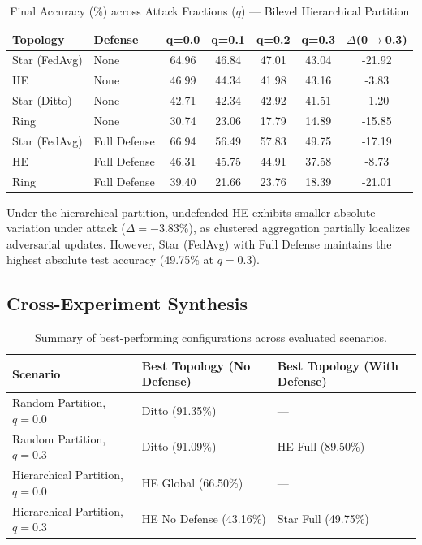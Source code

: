 \documentclass[11pt, a4paper]{article}
\begin{document}
\begin{table}[H]
    \centering
    \begin{tabular}{llccccc}
        \toprule
        \textbf{Topology} & \textbf{Defense} & \textbf{q=0.0} & \textbf{q=0.1} & \textbf{q=0.2} & \textbf{q=0.3} & \textbf{$\Delta$(0$\rightarrow$0.3)} \\
        \midrule
        Star (FedAvg)& None & 64.96 & 46.84 & 47.01 & 43.04 & -21.92 \\
        HE & None & 46.99 & 44.34 & 41.98 & 43.16 & -3.83 \\
        Star (Ditto) & None & 42.71 & 42.34 & 42.92 & 41.51 & -1.20 \\
        Ring & None & 30.74 & 23.06 & 17.79 & 14.89 & -15.85 \\
        \midrule
        Star (FedAvg)& Full Defense & 66.94 & 56.49 & 57.83 & 49.75 & -17.19 \\
        HE & Full Defense & 46.31 & 45.75 & 44.91 & 37.58 & -8.73 \\
        Ring & Full Defense & 39.40 & 21.66 & 23.76 & 18.39 & -21.01 \\
        \bottomrule
    \end{tabular}
    \caption{Final Accuracy (\%) across Attack Fractions ($q$) — Bilevel Hierarchical Partition}
\end{table}

Under the hierarchical partition, undefended HE exhibits smaller absolute variation under attack ($\Delta = -3.83\%$), as clustered aggregation partially localizes adversarial updates. However, Star (FedAvg) with Full Defense maintains the highest absolute test accuracy (49.75\% at $q=0.3$).

\subsection{Cross-Experiment Synthesis}
\begin{table}[H]
    \centering
    \begin{tabular}{lll}
        \toprule
        \textbf{Scenario} & \textbf{Best Topology (No Defense)} & \textbf{Best Topology (With Defense)} \\
        \midrule
        Random Partition, $q=0.0$ & Ditto (91.35\%) & — \\
        Random Partition, $q=0.3$ & Ditto (91.09\%) & HE Full (89.50\%) \\
        Hierarchical Partition, $q=0.0$ & HE Global (66.50\%) & — \\
        Hierarchical Partition, $q=0.3$ & HE No Defense (43.16\%) & Star Full (49.75\%) \\
        \bottomrule
    \end{tabular}
    \caption{Summary of best-performing configurations across evaluated scenarios.}
\end{table}
\end{document}
